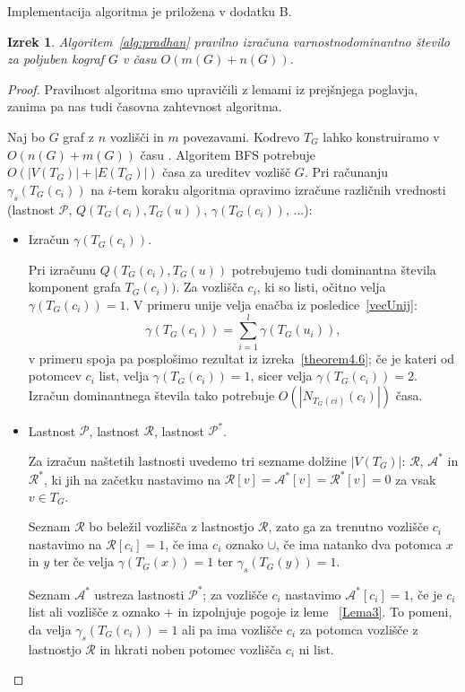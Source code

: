 \documentclass[12pt,a4paper,twoside]{article}
\theoremstyle{definition} %
\theoremstyle{plain} %
\newtheorem{izrek}[definicija]{Izrek}
\numberwithin{equation}{section}  %
\begin{document}
Implementacija algoritma je priložena v dodatku B.
\begin{izrek} Algoritem~\ref{alg:pradhan} pravilno izračuna varnostnodominantno število za poljuben kograf $G$ v času $O(m(G) + n(G))$.
\end{izrek}
\begin{proof}
Pravilnost algoritma smo upravičili z lemami iz prejšnjega poglavja, zanima pa nas tudi časovna zahtevnost algoritma.

Naj bo $G$ graf z $n$ vozlišči in $m$ povezavami. Kodrevo $T_G$ lahko konstruiramo v $O(n(G)+m(G))$ času \cite{corneil1985linear}. Algoritem BFS potrebuje $O(|V(T_G)| + |E(T_G)|)$ časa za ureditev vozlišč $G$. Pri računanju $\gamma_s(T_G(c_i))$ na $i$-tem koraku algoritma opravimo izračune različnih vrednosti (lastnost $\mathcal{P}$, $Q(T_G(c_i), T_G(u))$, $\gamma(T_G(c_i))$, ...):
\begin{itemize}
\item Izračun $\gamma(T_G(c_i))$.

Pri izračunu $Q(T_G(c_i), T_G(u))$ potrebujemo tudi dominantna števila komponent grafa $T_G(c_i))$. Za vozlišča $c_i$, ki so listi, očitno velja $\gamma(T_G(c_i)) = 1$. V primeru unije velja enačba iz  posledice~\ref{vecUnij}: $$\gamma(T_G(c_i)) = \sum\limits_{i=1}^l \gamma(T_G(u_i)),$$v primeru spoja pa posplošimo rezultat iz izreka~\ref{theorem4.6}; če je kateri od potomcev $c_i$ list, velja $\gamma(T_G(c_i)) = 1$, sicer velja $\gamma(T_G(c_i)) = 2$. Izračun dominantnega števila tako potrebuje $O(|N_{T_G(ci)}(c_i)|)$ časa.

\item Lastnost $\mathcal{P}$, lastnost $\mathcal{R}$, lastnost $\mathcal{P^*}$.

Za izračun naštetih lastnosti uvedemo tri sezname dolžine $|V(T_G)|$: $\mathcal{R}$, $\mathcal{A^*}$ in $\mathcal{R^*}$, ki jih na začetku nastavimo na $\mathcal{R}[v]=\mathcal{A^*}[v]=\mathcal{R^*}[v]=0$ za vsak $v\in T_G$.

Seznam $\mathcal{R}$ bo beležil vozlišča z lastnostjo $\mathcal{R}$, zato ga za trenutno vozlišče $c_i$ nastavimo na $\mathcal{R}[{c_i}]=1$, če ima $c_i$ oznako $\cup$, če ima natanko dva potomca $x$ in $y$ ter če velja $\gamma(T_G(x)) = 1$ ter $\gamma_s(T_G(y)) = 1$.

Seznam $\mathcal{A^*}$ ustreza lastnosti $\mathcal{P^*}$; za vozlišče $c_i$ nastavimo $\mathcal{A}^*[{c_i}]=1$, če je $c_i$ list ali vozlišče z oznako $+$ in izpolnjuje pogoje iz leme ~\ref{Lema3}. To pomeni, da velja  $\gamma_s(T_G(c_i)) = 1$ ali pa ima vozlišče $c_i$ za potomca vozlišče z lastnostjo $\mathcal{R}$ in hkrati noben potomec vozlišča $c_i$ ni list.


\end{itemize}
\end{proof}
\end{document}
